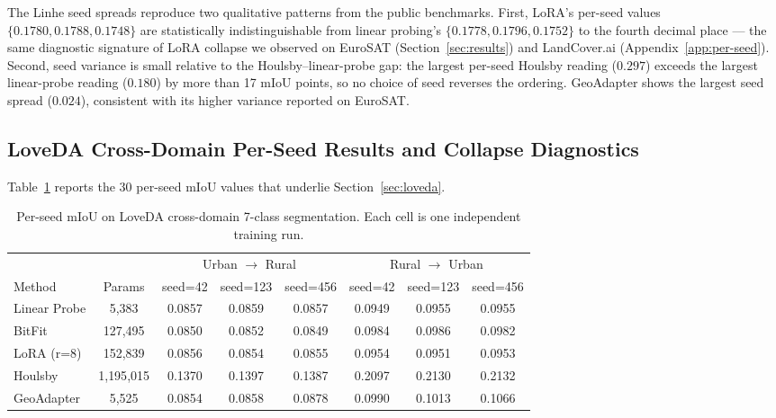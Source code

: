 \documentclass[11pt]{article}
\begin{document}
The Linhe seed spreads reproduce two qualitative patterns from the public benchmarks. First, LoRA's per-seed values $\{0.1780, 0.1788, 0.1748\}$ are statistically indistinguishable from linear probing's $\{0.1778, 0.1796, 0.1752\}$ to the fourth decimal place --- the same diagnostic signature of LoRA collapse we observed on EuroSAT (Section~\ref{sec:results}) and LandCover.ai (Appendix~\ref{app:per-seed}). Second, seed variance is small relative to the Houlsby--linear-probe gap: the largest per-seed Houlsby reading ($0.297$) exceeds the largest linear-probe reading ($0.180$) by more than 17 mIoU points, so no choice of seed reverses the ordering. GeoAdapter shows the largest seed spread ($0.024$), consistent with its higher variance reported on EuroSAT.

\subsection{LoveDA Cross-Domain Per-Seed Results and Collapse Diagnostics}
\label{app:loveda-perclass}

Table~\ref{tab:loveda-perseed} reports the 30 per-seed mIoU values that underlie Section~\ref{sec:loveda}.

\begin{table}[h]
\centering
\small
\caption{Per-seed mIoU on LoveDA cross-domain 7-class segmentation. Each cell is one independent training run.}
\label{tab:loveda-perseed}
\begin{tabular}{lccccccc}
\toprule
& & \multicolumn{3}{c}{Urban $\rightarrow$ Rural} & \multicolumn{3}{c}{Rural $\rightarrow$ Urban} \\
\cmidrule(lr){3-5}\cmidrule(lr){6-8}
Method & Params & seed=42 & seed=123 & seed=456 & seed=42 & seed=123 & seed=456 \\
\midrule
Linear Probe & 5{,}383       & 0.0857 & 0.0859 & 0.0857 & 0.0949 & 0.0955 & 0.0955 \\
BitFit       & 127{,}495     & 0.0850 & 0.0852 & 0.0849 & 0.0984 & 0.0986 & 0.0982 \\
LoRA (r=8)   & 152{,}839     & 0.0856 & 0.0854 & 0.0855 & 0.0954 & 0.0951 & 0.0953 \\
Houlsby      & 1{,}195{,}015 & 0.1370 & 0.1397 & 0.1387 & 0.2097 & 0.2130 & 0.2132 \\
GeoAdapter   & 5{,}525       & 0.0854 & 0.0858 & 0.0878 & 0.0990 & 0.1013 & 0.1066 \\
\bottomrule
\end{tabular}
\end{table}
\end{document}
